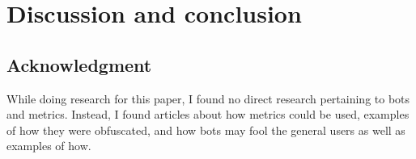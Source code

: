 \section{Discussion and conclusion}



\subsection*{Acknowledgment}
While doing research for this paper, I found no direct research pertaining to bots and metrics. Instead, I found articles about how metrics could be used, examples of how they were obfuscated, and how bots may fool the general users as well as examples of how. 







